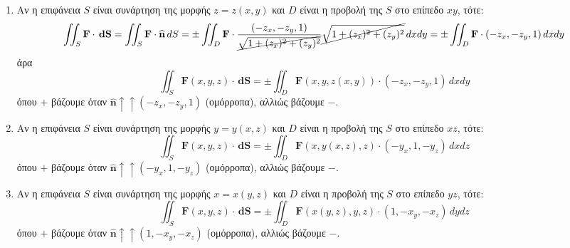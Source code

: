 \documentclass[a4paper,table]{report}
\begin{document}
\begin{enumerate}
  \item Αν η επιφάνεια $S$ είναι συνάρτηση της μορφής $ z=z(x,y) $ και $D$ είναι η 
    προβολή της $S$ στο επίπεδο $ xy $, τότε: 
    \[
      \iint_{S} \mathbf{F} \cdot \,{\mathbf{dS}} = \iint_{S} \mathbf{F} \cdot
      \mathbf{\widehat{n}} \,{dS} = 
      \pm\iint_{D} 
      \mathbf{F} \cdot \frac{(-z_{x},-z_{y},1)}{\cancel{\sqrt{1+(z_{x})^{2}+
      (z_{y})^{2}}}} \cancel{\sqrt{1+(z_{x})^{2}+(z_{y})^{2}}} \,{dx}{dy} = 
      \pm\iint_{D} \mathbf{F} \cdot (-z_{x},-z_{y},1) \,{dx}{dy}
    \]
    άρα
    \begin{equation*}
      \boxed{\iint_{S} \mathbf{F}(x,y,z) \cdot \,{\mathbf{dS}} = \pm\iint_{D} 
      \mathbf{F}(x,y,z(x,y)) \cdot (-z_{x},-z_{y},1) \,{dx}{dy}}
    \end{equation*} 
    όπου $ + $ βάζουμε όταν $ \mathbf{\widehat{n}} \uparrow\uparrow (-z_{x},-z_{y},1) $ (ομόρροπα), αλλιώς βάζουμε $ - $.

  \item Αν η επιφάνεια $S$ είναι συνάρτηση της μορφής $ y=y(x,z) $ και $D$ είναι η 
    προβολή της $S$ στο επίπεδο $ xz $, τότε: 
    \begin{equation*}
      \boxed{\iint_{S} \mathbf{F}(x,y,z) \cdot \,{\mathbf{dS}} = \pm\iint_{D} 
      \mathbf{F}(x,y(x,z),z) \cdot (-y_{x},1,-y_{z}) \,{dx}{dz}}
    \end{equation*}
    όπου $ + $ βάζουμε όταν $ \mathbf{\widehat{n}} \uparrow\uparrow (-y_{x},1,-y_{z}) $ (ομόρροπα), αλλιώς βάζουμε $ - $.

  \item Αν η επιφάνεια $S$ είναι συνάρτηση της μορφής $ x=x(y,z) $ και $D$ είναι η 
    προβολή της $S$ στο επίπεδο $ yz $, τότε: 
    \begin{equation*}
      \boxed{\iint_{S} \mathbf{F}(x,y,z) \cdot \,{\mathbf{dS}} = \pm\iint_{D} 
      \mathbf{F}(x(y,z),y,z) \cdot (1,-x_{y},-x_{z}) \,{dy}{dz}}
    \end{equation*}
    όπου $ + $ βάζουμε όταν $ \mathbf{\widehat{n}} \uparrow\uparrow (1,-x_{y},-x_{z}) $ (ομόρροπα), αλλιώς βάζουμε $ - $.

\end{enumerate}
\end{document}
